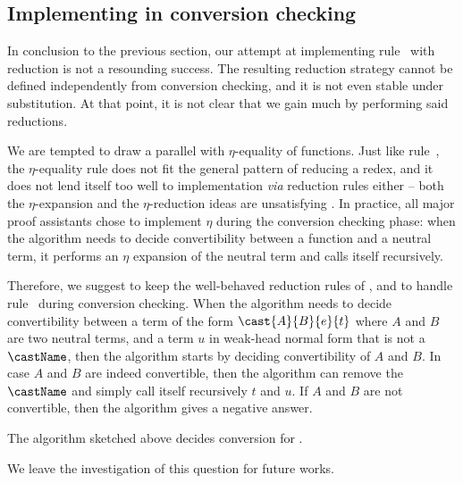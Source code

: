 \subsection{Implementing  in conversion checking}

In conclusion to the previous section, our attempt at implementing 
rule~ with reduction is not a resounding 
success.
% 
The resulting reduction strategy cannot be defined independently from 
conversion checking, and it is not even stable under substitution.
% 
At that point, it is not clear that we gain much by performing said reductions.

We are tempted to draw a parallel with \( \eta \)-equality of functions. 
% 
Just like rule~, the \( \eta \)-equality rule 
does not fit the general pattern of reducing a redex, and it does not lend 
itself too well to implementation \textit{via} reduction rules either -- both the
\( \eta \)-expansion and the \( \eta \)-reduction ideas are unsatisfying
.
% 
In practice, all major proof assistants chose to implement \( \eta \) during 
the conversion checking phase: when the algorithm needs to decide 
convertibility between a function and a neutral term, it performs an \( \eta \)
expansion of the neutral term and calls itself recursively.

Therefore, we suggest to keep the well-behaved reduction rules of \SetoidCC,
and to handle rule~ during conversion checking.
% 
When the algorithm needs to decide convertibility between a term of the form 
\( \cast{A}{B}{e}{t} \) where \( A \) and \( B \) are two neutral terms, and a
term \( u \) in weak-head normal form that is not a \( \castName \), then the 
algorithm starts by deciding convertibility of \( A \) and \( B \). 
% 
In case \( A \) and \( B \) are indeed convertible, then the algorithm can 
remove the \( \castName \) and simply call itself recursively \( t \) and 
\( u \).
% 
If \( A \) and \( B \) are not convertible, then the algorithm gives a negative 
answer.

\begin{conjecture}
  The algorithm sketched above decides conversion for \SetoidCCplus.
\end{conjecture}

We leave the investigation of this question for future works.

